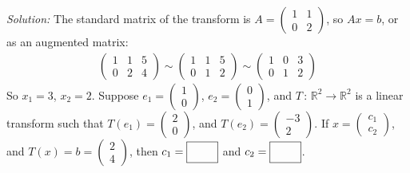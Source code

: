     \ifnum {} {\color{DarkBlue} \textit{Solution:} The standard matrix of the transform is $A = \begin{pmatrix} 1&1\\0&2\end{pmatrix}$, so $Ax = b$, or as an augmented matrix: 
    \begin{align}
        \begin{pmatrix}1&1&5\\0&2&4 \end{pmatrix}
        \sim \begin{pmatrix}1&1&5\\0&1&2 \end{pmatrix}
        \sim \begin{pmatrix}1&0&3\\0&1&2 \end{pmatrix}
    \end{align} 
    So $x_1 =3$, $x_2 = 2$. }\fi    
\fi 
\ifnum {}
     Suppose $e_1 = \begin{pmatrix}1\\0 \end{pmatrix}$, $e_2 = \begin{pmatrix} 0\\1\end{pmatrix}$, and $T \, : \, \mathbb R^2 \to \mathbb R^2$ is a linear transform such that $T(e_1) = \begin{pmatrix} 2\\0 \end{pmatrix}$, and $T(e_2) = \begin{pmatrix} -3\\2\end{pmatrix}$. If $x = \begin{pmatrix} c_1 \\ c_2 \end{pmatrix}$, and $T(x) = b = \begin{pmatrix} 2\\ 4\end{pmatrix}$, then $c_1 = \framebox{\strut\hspace{0.75cm}}$ and $c_2 = \framebox{\strut\hspace{0.75cm}}$. 
     
